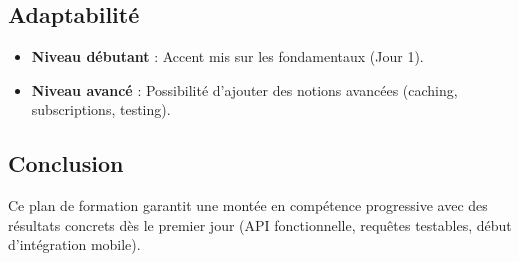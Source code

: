 \subsection*{Adaptabilité}
\begin{itemize}
  \item \textbf{Niveau débutant} : Accent mis sur les fondamentaux (Jour 1).
  \item \textbf{Niveau avancé} : Possibilité d’ajouter des notions avancées (caching, subscriptions, testing).
\end{itemize}

\subsection*{Conclusion}
Ce plan de formation garantit une montée en compétence progressive avec des résultats concrets dès le premier jour (API fonctionnelle, requêtes testables, début d’intégration mobile).

